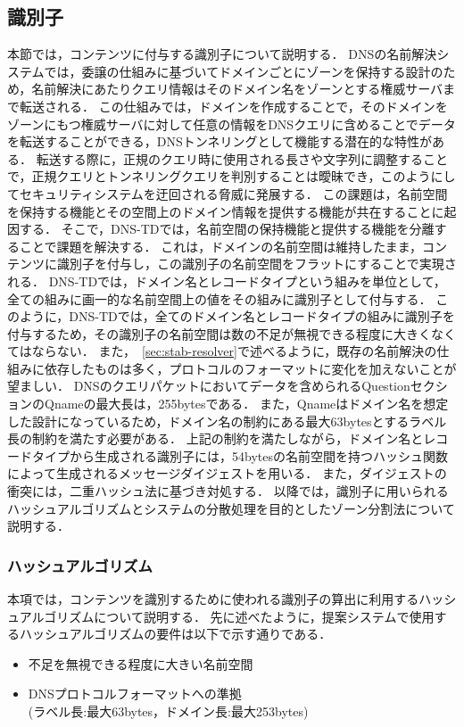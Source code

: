 \subsection{識別子}
本節では，コンテンツに付与する識別子について説明する．
DNSの名前解決システムでは，委譲の仕組みに基づいてドメインごとにゾーンを保持する設計のため，名前解決にあたりクエリ情報はそのドメイン名をゾーンとする権威サーバまで転送される．
この仕組みでは，ドメインを作成することで，そのドメインをゾーンにもつ権威サーバに対して任意の情報をDNSクエリに含めることでデータを転送することができる，DNSトンネリングとして機能する潜在的な特性がある．
転送する際に，正規のクエリ時に使用される長さや文字列に調整することで，正規クエリとトンネリングクエリを判別することは曖昧でき，このようにしてセキュリティシステムを迂回される脅威に発展する．
この課題は，名前空間を保持する機能とその空間上のドメイン情報を提供する機能が共在することに起因する．
そこで，DNS-TDでは，名前空間の保持機能と提供する機能を分離することで課題を解決する．
これは，ドメインの名前空間は維持したまま，コンテンツに識別子を付与し，この識別子の名前空間をフラットにすることで実現される．
DNS-TDでは，ドメイン名とレコードタイプという組みを単位として，全ての組みに画一的な名前空間上の値をその組みに識別子として付与する．
このように，DNS-TDでは，全てのドメイン名とレコードタイプの組みに識別子を付与するため，その識別子の名前空間は数の不足が無視できる程度に大きくなくてはならない．
また，~\ref{sec:stab-resolver}で述べるように，既存の名前解決の仕組みに依存したものは多く，プロトコルのフォーマットに変化を加えないことが望ましい．
DNSのクエリパケットにおいてデータを含められるQuestionセクションのQnameの最大長は，255bytesである．
また，Qnameはドメイン名を想定した設計になっているため，ドメイン名の制約にある最大63bytesとするラベル長の制約を満たす必要がある．
上記の制約を満たしながら，ドメイン名とレコードタイプから生成される識別子には，54bytesの名前空間を持つハッシュ関数によって生成されるメッセージダイジェストを用いる．
また，ダイジェストの衝突には，二重ハッシュ法に基づき対処する．
以降では，識別子に用いられるハッシュアルゴリズムとシステムの分散処理を目的としたゾーン分割法について説明する．

\subsubsection{ハッシュアルゴリズム}
本項では，コンテンツを識別するために使われる識別子の算出に利用するハッシュアルゴリズムについて説明する．
先に述べたように，提案システムで使用するハッシュアルゴリズムの要件は以下で示す通りである．
\begin{itemize}
 \item 不足を無視できる程度に大きい名前空間
 \vspace{-3mm}
 \item DNSプロトコルフォーマットへの準拠\\(ラベル長:最大63bytes，ドメイン長:最大253bytes)
\end{itemize}

